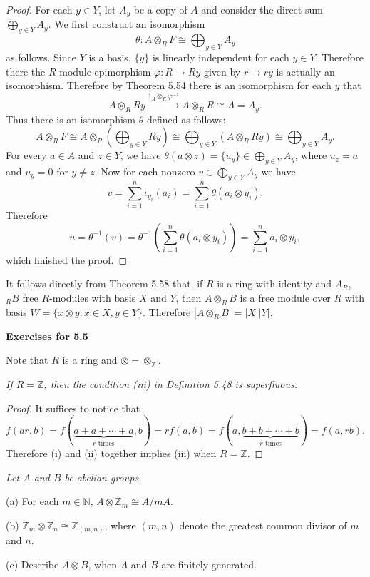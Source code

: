 \begin{proof}
For each $y\in Y$, let $A_y$ be a copy of $A$ and consider the direct sum $\bigoplus_{y\in Y}A_y$. We first construct an isomorphism 
$$
\theta :A\otimes _RF\cong \bigoplus_{y\in Y}{A_y}
$$
as follows. Since $Y$ is a basis, $\{y\}$ is linearly independent for each $y\in Y$. Therefore there the $R$-module epimorphism $\varphi:R\to Ry$ given by $r\mapsto ry$ is actually an isomorphism. Therefore by Theorem 5.54 there is an isomorphism for each $y$ that 
$$
A\otimes _RRy\overset{1_A\otimes _R\varphi ^{-1}}{\longrightarrow}A\otimes _RR\cong A=A_y.
$$
Thus there is an isomorphism $\theta$ defined as follows: 
$$
A\otimes _RF\cong A\otimes _R\left( \bigoplus_{y\in Y}{Ry} \right) \cong \bigoplus_{y\in Y}{\left( A\otimes _RRy \right)}\cong \bigoplus_{y\in Y}{A_y}.
$$
For every $a\in A$ and $z\in Y$, we have $\theta(a\otimes z)=\{u_y\}\in\bigoplus_{y\in Y}A_y$, where $u_z=a$ and $u_y=0$ for $y\ne z$. Now for each nonzero $v\in\bigoplus_{y\in Y}A_y$ we have 
$$
v=\sum_{i=1}^n{\iota _{y_i}\left( a_i \right)}=\sum_{i=1}^n{\theta \left( a_i\otimes y_i \right)}.
$$
Therefore 
$$
u=\theta ^{-1}\left( v \right) =\theta ^{-1}\left( \sum_{i=1}^n{\theta \left( a_i\otimes y_i \right)} \right) =\sum_{i=1}^n{a_i\otimes y_i},
$$
which finished the proof.
\end{proof}
It follows directly from Theorem 5.58 that, if $R$ is a ring with identity and $A_R$, $_RB$ free $R$-modules with basis $X$ and $Y$, then $A\otimes_RB$ is a free module over $R$ with basis $W=\{x\otimes y:x\in X,y\in Y\}$. Therefore $|A\otimes_RB|=|X||Y|$.
\begin{center}
\begin{large}
    \textbf{Exercises for 5.5}
\end{large}
\end{center}
Note that $R$ is a ring and $\otimes=\otimes_\mathbb{Z}$.
\begin{problem}\em
If $R=\mathbb{Z}$, then the condition (iii) in Definition 5.48 is superfluous.
\end{problem}
\begin{proof}
It suffices to notice that 
$$
f\left( ar,b \right) =f\left( \underset{r\,\,\mathrm{times}}{\underbrace{a+a+\cdots +a}},b \right) =rf\left( a,b \right) =f\left( a,\underset{r\,\,\mathrm{times}}{\underbrace{b+b+\cdots +b}} \right) =f\left( a,rb \right) .
$$
Therefore (i) and (ii) together implies (iii) when $R=\mathbb{Z}$.
\end{proof}
\begin{problem}\em
Let $A$ and $B$ be abelian groups.\par
(a) For each $m\in\mathbb{N}$, $A\otimes\mathbb{Z}_m\cong A/mA$.\par
(b) $\mathbb{Z}_m\otimes\mathbb{Z}_n\cong\mathbb{Z}_{(m,n)}$, where $(m,n)$ denote the greatest common divisor of $m$ and $n$.\par
(c) Describe $A\otimes B$, when $A$ and $B$ are finitely generated.
\end{problem}
